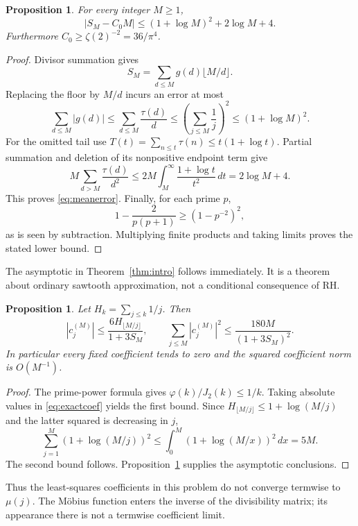 \documentclass[11pt]{amsart}
\newtheorem{proposition}[theorem]{Proposition}
\theoremstyle{definition}
\begin{document}
\begin{proposition}\label{prop:mean}
For every integer $M\ge1$,
\begin{equation}\label{eq:meanerror}
 |S_M-C_0M|\le(1+\log M)^2+2\log M+4.
\end{equation}
Furthermore $C_0\ge\zeta(2)^{-2}=36/\pi^4$.
\end{proposition}
\begin{proof}
Divisor summation gives
\[
 S_M=\sum_{d\le M}g(d)\lfloor M/d\rfloor.
\]
Replacing the floor by $M/d$ incurs an error at most
\[
 \sum_{d\le M}|g(d)|\le\sum_{d\le M}\frac{\tau(d)}d
 \le\left(\sum_{j\le M}\frac1j\right)^2\le(1+\log M)^2.
\]
For the omitted tail use $T(t)=\sum_{n\le t}\tau(n)\le t(1+\log t)$.
Partial summation and deletion of its nonpositive endpoint term give
\[
 M\sum_{d>M}\frac{\tau(d)}{d^2}
 \le2M\int_M^\infty\frac{1+\log t}{t^2}\,dt
 =2\log M+4.
\]
This proves \eqref{eq:meanerror}. Finally, for each prime $p$,
\[
 1-\frac2{p(p+1)}\ge(1-p^{-2})^2,
\]
as is seen by subtraction. Multiplying finite products and taking
limits proves the stated lower bound.
\end{proof}

The asymptotic in Theorem~\ref{thm:intro} follows immediately.
It is a theorem about ordinary sawtooth approximation, not a
conditional consequence of RH.

\begin{proposition}\label{prop:coefdecay}
Let $H_k=\sum_{j\le k}1/j$. Then
\[
 |c_j^{(M)}|\le\frac{6H_{\lfloor M/j\rfloor}}{1+3S_M},\qquad
 \sum_{j\le M}|c_j^{(M)}|^2\le\frac{180M}{(1+3S_M)^2}.
\]
In particular every fixed coefficient tends to zero and the squared
coefficient norm is $O(M^{-1})$.
\end{proposition}
\begin{proof}
The prime-power formula gives $\varphi(k)/J_2(k)\le1/k$.
Taking absolute values in \eqref{eq:exactcoef} yields the first bound.
Since $H_{\lfloor M/j\rfloor}\le1+\log(M/j)$ and the latter squared
is decreasing in $j$,
\[
 \sum_{j=1}^M(1+\log(M/j))^2
 \le\int_0^M(1+\log(M/x))^2\,dx=5M.
\]
The second bound follows. Proposition~\ref{prop:mean} supplies the
asymptotic conclusions.
\end{proof}

Thus the least-squares coefficients in this problem do not converge
termwise to $\mu(j)$. The M\"obius function enters the inverse of the
divisibility matrix; its appearance there is not a termwise coefficient
limit.
\end{document}

